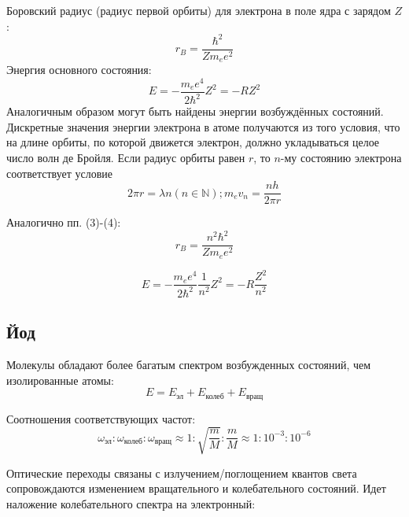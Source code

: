 \documentclass[a4paper]{article}
\begin{document}
Боровский радиус (радиус первой орбиты) для электрона в поле ядра с зарядом $Z$:
\begin{equation}
    r_B = \frac{\hbar^2}{Z m_e e^2}
\end{equation}
Энергия основного состояния:
\begin{equation}
    E = -\frac{m_e e^4}{2 \hbar^2}Z^2 = -R Z^2
\end{equation}
Аналогичным образом могут быть найдены энергии возбуждённых состояний. Дискретные значения 
энергии электрона в атоме получаются из того условия, что на длине орбиты, по которой движется 
электрон, должно укладываться целое число волн де Бройля. Если радиус орбиты равен $r$, то $n$-му 
состоянию электрона соответствует условие 
\begin{equation}
    2 \pi r = \lambda n (n \in \mathbb{N}) ; m_e v_n = \frac{nh}{2 \pi r}
\end{equation}

Аналогично пп. (3)-(4):
\begin{equation}
     r_B = \frac{n^2 \hbar^2}{Z m_e e^2}
\end{equation}

\begin{equation}
    E = -\frac{m_e e^4}{2 \hbar^2} \frac{1}{n^2} Z^2 = -R \frac{Z^2}{n^2}
\end{equation}

\subsection{Йод}

Молекулы обладают более багатым спектром возбужденных состояний, чем изолированные атомы:
$$E = E_{\text{эл}} + E_{\text{колеб}} + E_{\text{вращ}}$$

Соотношения соответствующих частот:
$$\omega_{\text{эл}} : \omega_{\text{колеб}}: \omega_{\text{вращ}} \approx 1 : \sqrt{
    \frac{m}{M}} : \frac{m}{M} \approx 1 : 10^{-3} : 10^{-6}
$$

Оптические переходы связаны с излучением/поглощением квантов света сопровождаются изменением вращательного
и колебательного состояний. Идет наложение колебательного спектра на электронный:
\end{document}

